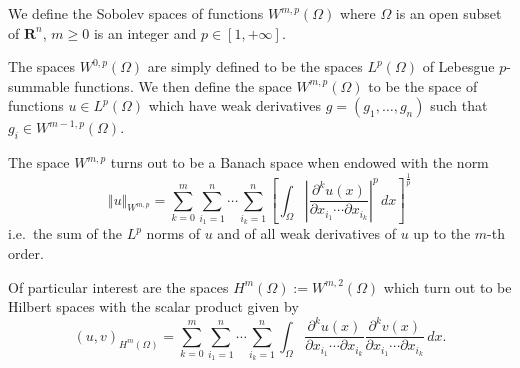 \documentclass[12pt]{article}
\newcommand{\R}{\mathbf R}
\begin{document}
We define the Sobolev spaces of functions $W^{m,p}(\Omega)$ where $\Omega$ is an open subset of $\R^n$, $m\ge 0$ is an integer and $p\in[1,+\infty]$.

The spaces $W^{0,p}(\Omega)$ are simply defined to be the spaces $L^p(\Omega)$ of Lebesgue $p$-summable functions. 
We then define the space $W^{m,p}(\Omega)$ to be the space of functions $u\in L^p(\Omega)$ which have weak derivatives $g=(g_1,\ldots,g_n)$ such that $g_i\in W^{m-1,p}(\Omega)$.

The space $W^{m,p}$ turns out to be a Banach space when endowed with the norm
\[
  \Vert u \Vert_{W^{m,p}}=
   \sum_{k=0}^m 
   \sum_{i_1=1}^n \cdots \sum_{i_k=1}^n
  \left[\int_\Omega 
\left|\frac{\partial^k u(x)}{\partial x_{i_1}\cdots\partial x_{i_k}}\right|^p
\, dx\right]^{\frac 1 p}
\]
i.e.\ the sum of the $L^p$ norms of $u$ and of all weak derivatives of $u$ up to the $m$-th order. 

Of particular interest are the spaces $H^m(\Omega):=W^{m,2}(\Omega)$ which turn out to be Hilbert spaces with the scalar product given by
\[
 (u,v)_{H^m(\Omega)}=\sum_{k=0}^m \sum_{i_1=1}^n \cdots \sum_{i_k=1}^n
  \int_\Omega 
\frac{\partial^k u(x)}{\partial x_{i_1}\cdots\partial x_{i_k}}
\frac{\partial^k v(x)}{\partial x_{i_1}\cdots\partial x_{i_k}}
\, dx.
\]
\end{document}
